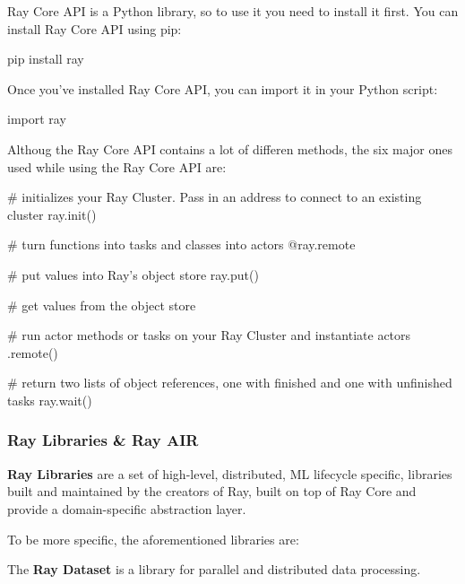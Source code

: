Ray Core API is a Python library, so to use it you need to install it first. You can install Ray Core API using pip:
\begin{bash}
pip install ray
\end{bash}

Once you've installed Ray Core API, you can import it in your Python script:
\begin{bash}
import ray
\end{bash}

Althoug the Ray Core API contains a lot of differen methods, the six major ones used while using the Ray Core API are:

\begin{bash}
# initializes your Ray Cluster. Pass in an address to connect to an existing cluster
ray.init()
\end{bash}

\begin{bash}
# turn functions into tasks and classes into actors
@ray.remote
\end{bash}

\begin{bash}
# put values into Ray's object store
ray.put()
\end{bash}

\begin{bash}
# get values from the object store
\end{bash}

\begin{bash}
# run actor methods or tasks on your Ray Cluster and instantiate actors
.remote()
\end{bash}

\begin{bash}
# return two lists of object references, one with finished and one with unfinished tasks
ray.wait()
\end{bash}

\subsubsection{Ray Libraries \& Ray AIR}

\textbf{Ray Libraries} are a set of high-level, distributed, ML lifecycle specific, libraries built and maintained
by the creators of Ray, built on top of Ray Core and provide a domain-specific abstraction layer.
\ed

To be more specific, the aforementioned libraries are:

The \textbf{Ray Dataset} is a library for parallel and distributed data processing.
\ed


